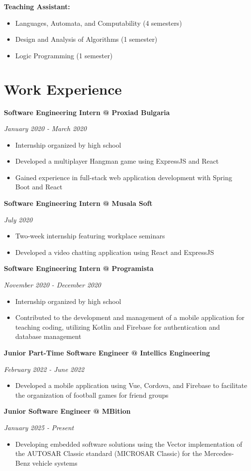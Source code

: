 \documentclass[a4paper,10pt]{article}
\begin{document}
\textbf{Teaching Assistant:}
\begin{itemize}
    \item Languages, Automata, and Computability (4 semesters)
    \item Design and Analysis of Algorithms (1 semester)
    \item Logic Programming (1 semester)
\end{itemize}

\section*{Work Experience}

\textbf{Software Engineering Intern @ Proxiad Bulgaria}

\textit{January 2020 - March 2020}
\begin{itemize}
    \item Internship organized by high school
    \item Developed a multiplayer Hangman game using ExpressJS and React
    \item Gained experience in full-stack web application development with Spring Boot and React
\end{itemize}

\textbf{Software Engineering Intern @ Musala Soft}

\textit{July 2020}
\begin{itemize}
    \item Two-week internship featuring workplace seminars
    \item Developed a video chatting application using React and ExpressJS
\end{itemize}

\textbf{Software Engineering Intern @ Programista}

\textit{November 2020 - December 2020}
\begin{itemize}
    \item Internship organized by high school
    \item Contributed to the development and management of a mobile application for teaching coding, utilizing Kotlin and Firebase for authentication and database management
\end{itemize}

\textbf{Junior Part-Time Software Engineer @ Intellics Engineering}

\textit{February 2022 - June 2022}
\begin{itemize}
    \item Developed a mobile application using Vue, Cordova, and Firebase to facilitate the organization of football games for friend groups
\end{itemize}

\textbf{Junior Software Engineer @ MBition}

\textit{January 2025 - Present}
\begin{itemize}
    \item Developing embedded software solutions using the Vector implementation of the AUTOSAR Classic standard (MICROSAR Classic) for the Mercedes-Benz vehicle systems
\end{itemize}
\end{document}
